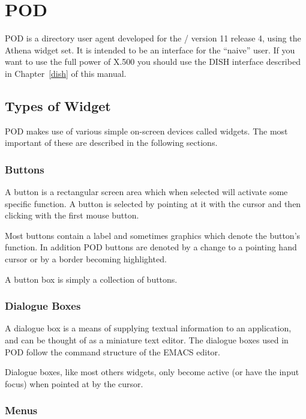 
\chapter {POD}
\label{pod}

POD is a directory user agent developed for the \xwindows/
version 11 release 4, using the Athena widget set.
It is intended to be an interface for the ``naive'' user.
If you want to use the full power of X.500 you should use the DISH interface
described in Chapter~\ref{dish} of this manual.

\section {Types of Widget}

POD makes use of various simple on-screen devices called widgets.
The most important of these are described in the following sections.

\subsection {Buttons}

A button is a rectangular screen area which when selected will activate some
specific function.
A button is selected by pointing at it with the cursor and then
clicking with the first mouse button.

Most buttons contain a label and sometimes graphics
which denote the button's function.
In addition POD buttons are denoted by a change to a pointing hand cursor or by
a border becoming highlighted.

A button box is simply a collection of buttons.

\subsection {Dialogue Boxes}

A dialogue box is a means of supplying textual information to an application,
and can be thought of as a miniature text editor.
The dialogue boxes used in POD follow the command structure of the EMACS
editor.

Dialogue boxes,
like most others widgets,
only become active (or have the input focus) when pointed at by the cursor.

\subsection {Menus}


